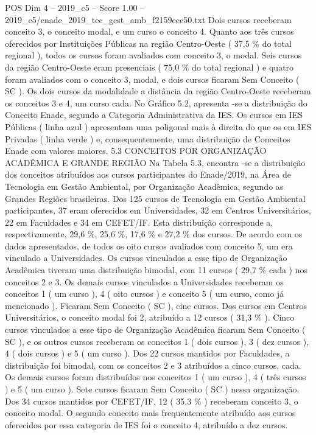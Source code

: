 \begin{textsample}{POS Dim 4 – 2019\_c5 – Score 1.00 – 2019\_c5/enade\_2019\_tec\_gest\_amb\_f2159ecc50.txt}
Dois cursos receberam conceito 3, o conceito modal, e um curso o conceito 4.
Quanto aos três cursos oferecidos por Instituições Públicas na região Centro-Oeste ( 37,5 \% do total regional ), todos os cursos foram avaliados com conceito 3, o modal.
Seis cursos da região Centro-Oeste eram presenciais ( 75,0 \% do total regional ) e quatro foram avaliados com o conceito 3, modal, e dois cursos ficaram Sem Conceito ( SC ).
Os dois cursos da modalidade a distância da região Centro-Oeste receberam os conceitos 3 e 4, um curso cada.
No Gráfico 5.2, apresenta -se a distribuição do Conceito Enade, segundo a Categoria Administrativa da IES.
Os cursos em IES Públicas ( linha azul ) apresentam uma poligonal mais à direita do que os em IES Privadas ( linha verde ) e, consequentemente, uma distribuição de Conceitos Enade com valores maiores. 5.3 CONCEITOS POR ORGANIZAÇÃO ACADÊMICA E GRANDE REGIÃO Na Tabela 5.3, encontra -se a distribuição dos conceitos atribuídos aos cursos participantes do Enade/2019, na Área de Tecnologia em Gestão Ambiental, por Organização Acadêmica, segundo as Grandes Regiões brasileiras.
Dos 125 cursos de Tecnologia em Gestão Ambiental participantes, 37 eram oferecidos em Universidades, 32 em Centros Universitários, 22 em Faculdades e 34 em CEFET/IF.
Esta distribuição corresponde a, respectivamente, 29,6 \%, 25,6 \%, 17,6 \% e 27,2 \% dos cursos.
De acordo com os dados apresentados, de todos os oito cursos avaliados com conceito 5, um era vinculado a Universidades.
Os cursos vinculados a esse tipo de Organização Acadêmica tiveram uma distribuição bimodal, com 11 cursos ( 29,7 \% cada ) nos conceitos 2 e 3.
Os demais cursos vinculados a Universidades receberam os conceitos 1 ( um curso ), 4 ( oito cursos ) e conceito 5 ( um curso, como já mencionado ).
Ficaram Sem Conceito ( SC ), cinc cursos.
Dos cursos em Centros Universitários, o conceito modal foi 2, atribuído a 12 cursos ( 31,3 \% ).
Cinco cursos vinculados a esse tipo de Organização Acadêmica ficaram Sem Conceito ( SC ), e os outros cursos receberam os conceitos 1 ( dois cursos ), 3 ( dez cursos ), 4 ( dois cursos ) e 5 ( um curso ).
Dos 22 cursos mantidos por Faculdades, a distribuição foi bimodal, com os conceitos 2 e 3 atribuídos a cinco cursos, cada.
Os demais cursos foram distribuídos nos conceitos 1 ( um curso ), 4 ( três cursos ) e 5 ( um curso ).
Sete cursos ficaram Sem Conceito ( SC ) nessa organização.
Dos 34 cursos mantidos por CEFET/IF, 12 ( 35,3 \% ) receberam conceito 3, o conceito modal.
O segundo conceito mais frequentemente atribuído aos cursos oferecidos por essa categoria de IES foi o conceito 4, atribuído a dez cursos.

\end{textsample}
